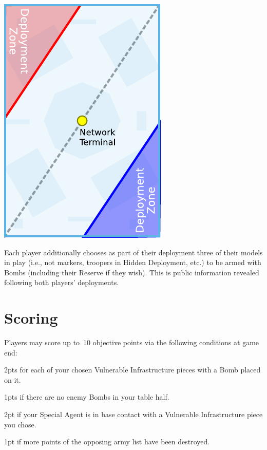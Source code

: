 \begin{minipage}[t]{2in}\centering
\vspace{4pt}   
\includegraphics{maps/map-plant}
\end{minipage}

Each player additionally chooses as part of their deployment three of
their models in play (i.e., not markers, troopers in Hidden
Deployment, etc.) to be armed with Bombs (including their Reserve if
they wish).  This is public information revealed following both
players' deployments.

\section{Scoring}

Players may score up to~10 objective points via the following
conditions at game end:
\begin{squishitemize}

\item 2pts for each of your chosen Vulnerable Infrastructure pieces
  with a Bomb placed on it.


\item 1pts if there are no enemy Bombs in your table half.

\item 2pt if your Special Agent is in base contact with a Vulnerable
  Infrastructure piece you chose.
  
\item 1pt if more points of the opposing army list have been destroyed.
\end{squishitemize}


